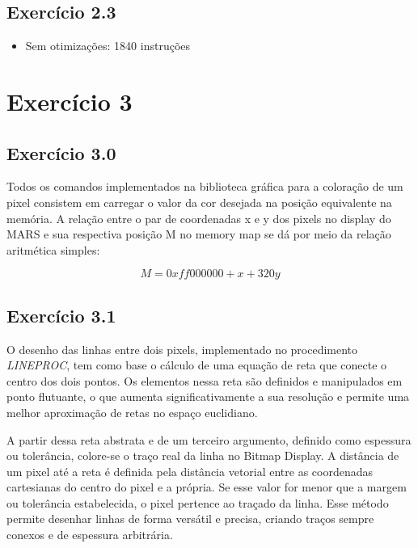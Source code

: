 \documentclass[12pt, a4paper, twoside]{article}
\begin{document}
\subsection{Exercício 2.3}


\begin{itemize}
    \item Sem otimizações: 1840 instruções
\end{itemize}

\section{Exercício 3}

\subsection{Exercício 3.0}
Todos os comandos implementados na biblioteca gráfica para a coloração de um pixel consistem em carregar o valor da cor desejada na posição equivalente na memória. A relação entre o par de coordenadas x e y dos pixels no display do MARS e sua respectiva posição M no memory map se dá por meio da relação aritmética simples:

$$M = 0xff000000 + x + 320y $$
 
\subsection{Exercício 3.1}

O desenho das linhas entre dois pixels, implementado no procedimento \textit{LINEPROC}, tem como base o cálculo de uma equação de reta que conecte o centro dos dois pontos. Os elementos nessa reta são definidos e manipulados em ponto flutuante, o que aumenta significativamente a sua resolução e permite uma melhor aproximação de retas no espaço euclidiano.

A partir dessa reta abstrata e de um terceiro argumento, definido como espessura ou tolerância, colore-se o traço real da linha no Bitmap Display. A distância de um pixel até a reta é definida pela distância vetorial entre as coordenadas cartesianas do centro do pixel e a própria. Se esse valor for menor que a margem ou tolerância estabelecida, o pixel pertence ao traçado da linha. Esse método permite desenhar linhas de forma versátil e precisa, criando traços sempre conexos e de espessura arbitrária.
\end{document}
